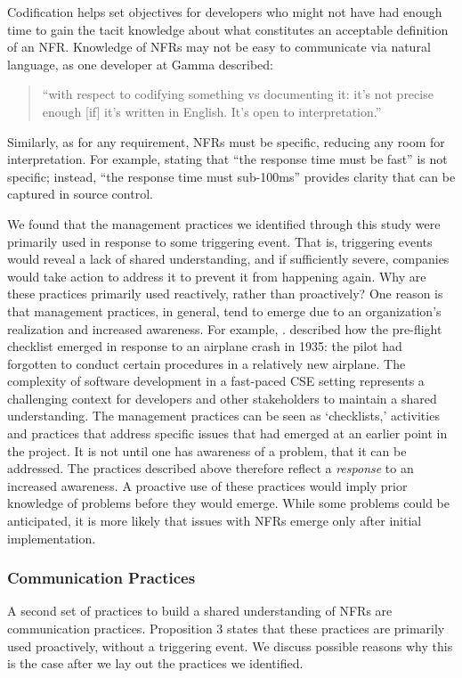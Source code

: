 \documentclass[smallextended]{svjour3}
\begin{document}
Codification helps set objectives for developers who might not have had enough time to gain the tacit knowledge about what constitutes an acceptable definition of an NFR.
Knowledge of NFRs may not be easy to communicate via natural language, as one developer at Gamma described:
\begin{quote}
    ``with respect to codifying something vs documenting it: it's not precise enough [if] it's written in English. It's open to interpretation.''
\end{quote}
Similarly, as for any requirement, NFRs must be specific, reducing any room for interpretation. For example, stating that ``the response time must be fast'' is not specific; instead, ``the response time must sub-100ms'' provides clarity that can be captured in source control. 


We found that the management practices we identified through this study were primarily used in response to some triggering event. That is, triggering events would reveal a lack of shared understanding, and if sufficiently severe, companies would take action to address it to prevent it from happening again. 
Why are these practices primarily used reactively, rather than proactively? 
One reason is that management practices, in general, tend to emerge due to an organization's realization and increased awareness. For example, \citet[p. 33]{gawande2010checklist}. described how the pre-flight checklist emerged in response to an airplane crash in 1935: the pilot had forgotten to conduct certain procedures in a relatively new airplane. The complexity of software development in a fast-paced CSE setting represents a challenging context for developers and other stakeholders to maintain a shared understanding. The management practices can be seen as `checklists,' activities and practices that address specific issues that had emerged at an earlier point in the project.
It is not until one has awareness of a problem, that it can be addressed.  
The practices described above therefore reflect a \textit{response} to an increased awareness. A proactive use of these practices would imply prior knowledge of problems before they would emerge. While some problems could be anticipated, it is more likely that issues with NFRs emerge only after initial implementation.


\subsubsection{Communication Practices}
\label{sub:communication}
A second set of practices to build a shared understanding of NFRs are communication practices. Proposition 3 states that these practices are primarily used proactively, without a triggering event. We discuss possible reasons why this is the case after we lay out the practices we identified.
\end{document}
